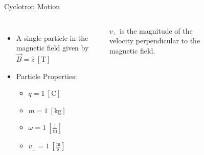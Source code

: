 \documentclass[aspectratio=169, 16pt]{beamer}
\newcommand{\unit}[1]{
    \: \left[ \text{#1} \right]
}
\newcommand{\fracunit}[2]{
    \: \left[
    \frac{\text{#1}}{\text{#2}}
    \right]
}
\begin{document}
%
\begin{frame}{Cyclotron Motion}
  \vfill{}
  \begin{columns}
    \centering
    \begin{itemize}
      \item A single particle in the magnetic field given by $\vec{B} =  \hat{z} \unit{T}$
      \item Particle Properties:
      \begin{itemize}
        \item $q = 1 \unit{C}$
        \item $m  = 1 \unit{kg}$ 
        \item $\omega = 1 \fracunit{1}{m}$
        \item $v_\perp = 1 \fracunit{m}{s}$
      \end{itemize}
    \end{itemize}
    $v_\perp$ is the magnitude of the velocity perpendicular to the magnetic field.
    \vspace{0.75cm}
    \begin{figure}[ht]
    \end{figure}
  \end{columns}
\end{frame}
\end{document}
